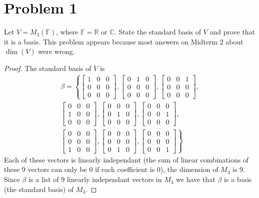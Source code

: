 \documentclass[12pt]{article}
\begin{document}
\section*{Problem 1}
Let \(V = M_{3}(\mathbb{F})\), where \(\mathbb{F} = \mathbb{R}\) or \(\mathbb{C}\). State the standard basis of \(V\) and prove that it is a basis.
This problem appears because most answers on Midterm 2 about \(\dim(V)\) were wrong.
\begin{proof}
	The standard basis of $V$ is
\[
	\begin{aligned}
		\beta = \left\{
		\begin{bmatrix}
		1 & 0 & 0 \\
		0 & 0 & 0 \\
		0 & 0 & 0
		\end{bmatrix},
		\begin{bmatrix}
		0 & 1 & 0 \\
		0 & 0 & 0 \\
		0 & 0 & 0
		\end{bmatrix},
		\begin{bmatrix}
		0 & 0 & 1 \\
		0 & 0 & 0 \\
		0 & 0 & 0
		\end{bmatrix},\right. \\[4pt]
		\left.
		\begin{bmatrix}
		0 & 0 & 0 \\
		1 & 0 & 0 \\
		0 & 0 & 0
		\end{bmatrix},
		\begin{bmatrix}
		0 & 0 & 0 \\
		0 & 1 & 0 \\
		0 & 0 & 0
		\end{bmatrix},
		\begin{bmatrix}
		0 & 0 & 0 \\
		0 & 0 & 1 \\
		0 & 0 & 0
		\end{bmatrix},\right. \\[4pt]
		\left.
		\begin{bmatrix}
		0 & 0 & 0 \\
		0 & 0 & 0 \\
		1 & 0 & 0
		\end{bmatrix},
		\begin{bmatrix}
		0 & 0 & 0 \\
		0 & 0 & 0 \\
		0 & 1 & 0
		\end{bmatrix},
		\begin{bmatrix}
		0 & 0 & 0 \\
		0 & 0 & 0 \\
		0 & 0 & 1
		\end{bmatrix}
		\right\}
	\end{aligned}
\]
Each of these vectors is linearly independant (the sum of linear combinations of these 9 vectors can only be 0 if each coefficient is 0), the dimension of $M_3$ is 9. Since $\beta$ is a list of 9 linearly independant vectors in $M_3$ we have that $\beta$ is a basis (the standard basis) of $M_3$.
\end{proof}
\end{document}
